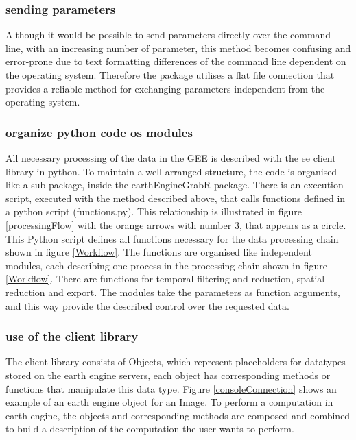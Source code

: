 \subsubsection{sending parameters}

Although it would be possible to send parameters directly over the command line, with an increasing number of parameter, this method becomes confusing and error-prone due to text formatting differences of the command line dependent on the operating system. Therefore the package utilises a flat file connection that provides a reliable method for exchanging parameters independent from the operating system.

\subsubsection{organize python code os modules}

All necessary processing of the data in the GEE is described with the ee client library in python. To maintain a well-arranged structure, the code is organised like a sub-package, inside the earthEngineGrabR package. There is an execution script, executed with the method described above, that calls functions defined in a python script (functions.py). This relationship is illustrated in figure \ref{processingFlow} with the orange arrows with number 3, that appears as a circle. This Python script defines all functions necessary for the data processing chain shown in figure \ref*{Workflow}. The functions are organised like independent modules, each describing one process in the processing chain shown in figure \ref*{Workflow}. There are functions for temporal filtering and reduction, spatial reduction and export. The modules take the parameters as function arguments, and this way provide the described control over the requested data.

\subsubsection{use of the client library}

The client library consists of Objects, which represent placeholders for datatypes stored on the earth engine servers, each object has corresponding methods or functions that manipulate this data type. Figure \ref{consoleConnection} shows an example of an earth engine object for an Image. To perform a computation in earth engine, the objects and corresponding methods are composed and combined to build a description of the computation the user wants to perform. 

